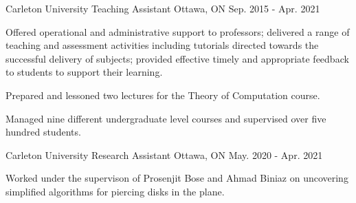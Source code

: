 \begin{cventries}
\cventry
{Carleton University}
{Teaching Assistant}
{Ottawa, ON}
{Sep. 2015 - Apr. 2021}
{\begin{cvitems}
    \item {Offered operational and administrative support to professors; delivered a range of teaching and assessment activities including tutorials directed towards the successful delivery of subjects; provided effective timely and appropriate feedback to students to support their learning.}
    \item {Prepared and lessoned two lectures for the Theory of Computation course.}
    \item {Managed nine different undergraduate level courses and supervised over five hundred students.}
\end{cvitems}}

\cventry
{Carleton University}
{Research Assistant}
{Ottawa, ON}
{May. 2020 - Apr. 2021}
{\begin{cvitems}
    \item {Worked under the supervison of Prosenjit Bose and Ahmad Biniaz on uncovering simplified algorithms for piercing disks in the plane.}
\end{cvitems}}

\end{cventries}
